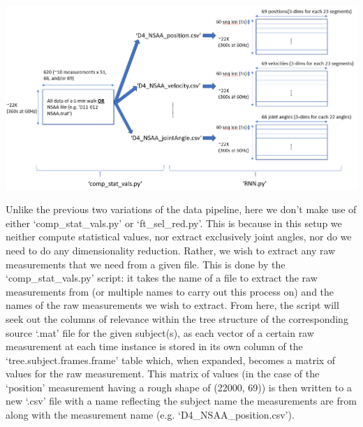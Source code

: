 \documentclass[12pt,twoside]{report}
\begin{document}
\begin{center}
\includegraphics[scale=0.35]{project_figures/fig8_8}
\end{center}

\quad Unlike the previous two variations of the data pipeline, here we don’t make use of either ‘comp\_stat\_vals.py’ or ‘ft\_sel\_red.py’. This is because in this setup we neither compute statistical values, nor extract exclusively joint angles, nor do we need to do any dimensionality reduction. Rather, we wish to extract any raw measurements that we need from a given file. This is done by the ‘comp\_stat\_vals.py’ script: it takes the name of a file to extract the raw measurements from (or multiple names to carry out this process on) and the names of the raw measurements we wish to extract. From here, the script will seek out the columns of relevance within the tree structure of the corresponding source ‘.mat’ file for the given subject(s), as each vector of a certain raw measurement at each time instance is stored in its own column of the ‘tree.subject.frames.frame’ table which, when expanded, becomes a matrix of values for the raw measurement. This matrix of values (in the case of the ‘position’ measurement having a rough shape of (22000, 69)) is then written to a new ‘.csv’ file with a name reflecting the subject name the measurements are from along with the measurement name (e.g. ‘D4\_NSAA\_position.csv’).\\
\end{document}
